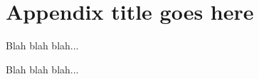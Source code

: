 
\chapter{Appendix title goes here}
\label{appendix1}



Blah blah blah...

\newpage

Blah blah blah...
